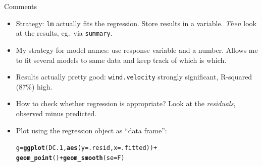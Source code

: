 \documentclass[unknownkeysallowed]{beamer}\usepackage[]{graphicx}\usepackage[]{color}
\makeatletter
\newcommand{\hlopt}[1]{\textcolor[rgb]{0,0,0}{#1}}%
\newcommand{\hlstd}[1]{\textcolor[rgb]{0.345,0.345,0.345}{#1}}%
\newcommand{\hlkwb}[1]{\textcolor[rgb]{0.69,0.353,0.396}{#1}}%
\newcommand{\hlkwc}[1]{\textcolor[rgb]{0.333,0.667,0.333}{#1}}%
\newcommand{\hlkwd}[1]{\textcolor[rgb]{0.737,0.353,0.396}{\textbf{#1}}}%
\newenvironment{kframe}{%
 \def\at@end@of@kframe{}%
 \ifinner\ifhmode%
  \def\at@end@of@kframe{\end{minipage}}%
  \begin{minipage}{\columnwidth}%
 \fi\fi%
 \def\FrameCommand##1{\hskip\@totalleftmargin \hskip-\fboxsep
 \colorbox{shadecolor}{##1}\hskip-\fboxsep
     \hskip-\linewidth \hskip-\@totalleftmargin \hskip\columnwidth}%
 \MakeFramed {\advance\hsize-\width
   \@totalleftmargin\z@ \linewidth\hsize
   \@setminipage}}%
 {\par\unskip\endMakeFramed%
 \at@end@of@kframe}
\newenvironment{knitrout}{}{} %
\makeatother
\begin{document}
\begin{frame}[fragile]{Comments}

  \begin{itemize}
  \item Strategy: \texttt{lm} actually fits the regression. Store
    results in a variable. \emph{Then} look at the results, eg.\ via
    \texttt{summary}. 
  \item My strategy for model names: use response variable and a
    number. Allows me to fit several models to same data and keep
    track of which is which.
  \item Results actually pretty good: \texttt{wind.velocity} strongly
  significant, R-squared (87\%) high.
\item How to check whether regression is appropriate? Look at the
  \emph{residuals}, observed minus predicted.
  \item Plot using the regression object as ``data frame'':

\begin{knitrout}
\color{fgcolor}\begin{kframe}
\begin{alltt}
\hlstd{g}\hlkwb{=}\hlkwd{ggplot}\hlstd{(DC.1,}\hlkwd{aes}\hlstd{(}\hlkwc{y}\hlstd{=.resid,}\hlkwc{x}\hlstd{=.fitted))}\hlopt{+}
  \hlkwd{geom_point}\hlstd{()}\hlopt{+}\hlkwd{geom_smooth}\hlstd{(}\hlkwc{se}\hlstd{=F)}
\end{alltt}
\end{kframe}
\end{knitrout}



  \end{itemize}
\end{frame}
\end{document}
